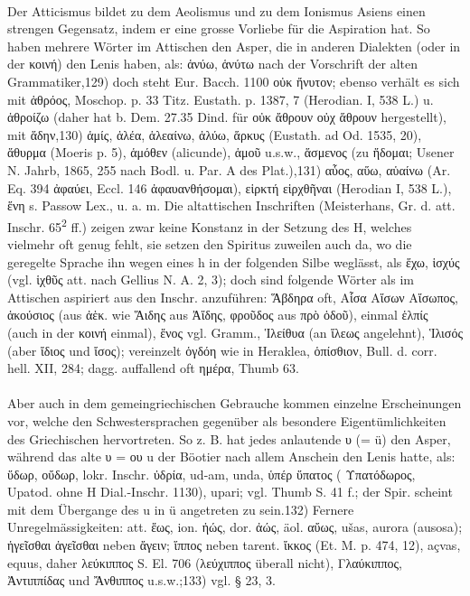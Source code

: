 \paragraph{} Der Atticismus bildet zu dem Aeolismus und zu dem Ionismus Asiens einen strengen Gegensatz, indem er eine grosse Vorliebe für die Aspiration hat. So haben mehrere Wörter im Attischen den Asper, die in anderen Dialekten (oder in der κοινή) den Lenis haben, als: ἁνύω, ἁνύτω nach der Vorschrift der alten Grammatiker,129) doch steht Eur. Bacch. 1100 οὐκ ἤνυτον; ebenso verhält es sich mit ἁθρόος, Moschop. p. 33 Titz. Eustath. p. 1387, 7 (Herodian. I, 538 L.) u. ἁθροίζω (daher hat b. Dem. 27.35 Dind. für οὐκ ἄθρουν οὐχ ἅθρουν hergestellt), mit ἅδην,130) ἁμίς, ἁλέα, ἁλεαίνω, ἁλύω, ἅρκυς (Eustath. ad Od. 1535, 20), ἅθυρμα (Moeris p. 5), ἁμόθεν (alicunde), ἁμοῦ u.s.w., ἅσμενος (zu ἥδομαι; Usener N. Jahrb, 1865, 255 nach Bodl. u. Par. A des Plat.),131) αὗος, αὕω, αὑαίνω (Ar. Eq. 394 ἀφαύει, Eccl. 146 ἀφαυανθήσομαι), εἱρκτή εἱρχθῆναι (Herodian I, 538 L.), ἕνη s. Passow Lex., u. a. m. Die altattischen Inschriften (Meisterhans, Gr. d. att. Inschr. 65\textsuperscript{2} ff.) zeigen zwar keine Konstanz in der Setzung des H, welches vielmehr oft genug fehlt, sie setzen den Spiritus zuweilen auch da, wo die geregelte Sprache ihn wegen eines h in der folgenden Silbe weglässt, als ἕχω, ἱσχύς (vgl. ἱχθῦς att. nach Gellius N. A. 2, 3); doch sind folgende Wörter als im Attischen aspiriert aus den Inschr. anzuführen: Ἅβδηρα oft, Αἷσα Αἵσων Αἵσωπος, ἁκούσιος (aus ἀἑκ. wie Ἅιδης aus Ἀἵδης, φροῦδος aus πρὸ ὁδοῦ), einmal ἑλπίς (auch in der κοινή einmal), ἕνος vgl. Gramm., Ἱλείθυα (an ἵλεως angelehnt), Ἱλισός (aber ἴδιος und ἴσος); vereinzelt ὁγδόη wie in Heraklea, ὁπίσθιον, Bull. d. corr. hell. XII, 284; dagg. auffallend oft ημέρα, Thumb 63. 

\paragraph{} Aber auch in dem gemeingriechischen Gebrauche kommen einzelne Erscheinungen vor, welche den Schwestersprachen gegenüber als besondere Eigentümlichkeiten des Griechischen hervortreten. So z. B. hat jedes anlautende υ (= ü) den Asper, während das alte υ = ου u der Böotier nach allem Anschein den Lenis hatte, als: ὕδωρ,  οὔδωρ, lokr. Inschr. ὐδρία,  ud-am,  unda, ὑπέρ ὕπατος ( Υπατόδωρος, Upatod. ohne H Dial.-Inschr. 1130),  upari; vgl. Thumb S. 41 f.; der Spir. scheint mit dem Übergange des u in ü angetreten zu sein.132) Fernere Unregelmässigkeiten: att. ἕως, ion. ἠώς, dor. ἀώς, äol. αὔως,  ušas,  aurora (ausosa); ἡγεῖσθαι ἁγεῖσθαι neben ἄγειν; ἵππος neben tarent. ἴκκος (Et. M. p. 474, 12),  açvas,  equus, daher λεύκιππος S. El. 706 (λεύχιππος überall nicht), Γλαύκιππος,  Ἀντιππίδας und Ἄνθιππος u.s.w.;133) vgl. § 23, 3. 


